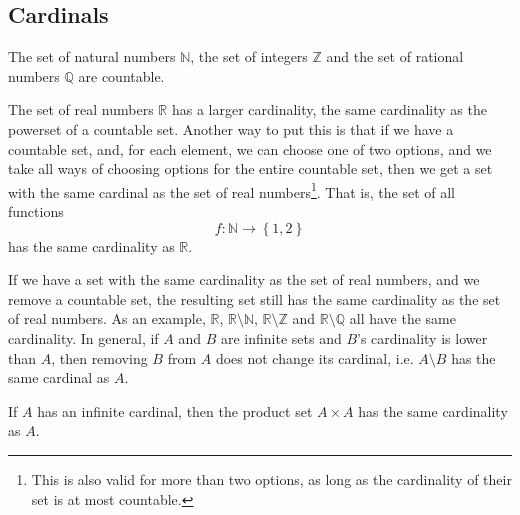 \documentclass[a4paper
]{article}
\def\reale{\mathbb{R}}
\def\intregi{\mathbb{Z}}
\def\naturale{\mathbb{N}}
\def\rationale{\mathbb{Q}}
\newcommand{\multime}[1]{\left\{ #1 \right\}}
\begin{document}
\subsection{Cardinals}
\label{sec:cardinals}

The set of natural numbers $\naturale$, the set of integers $\intregi$ and
the set of rational numbers $\rationale$ are countable.

The set of real numbers $\reale$ has a larger cardinality, the same cardinality
as the powerset of a countable set. Another way to put this is that
if we have a countable set, and, for each element, we can choose one of two
options,
and we take all ways of choosing options for the entire countable set,
then we get a set with the same cardinal as the set of real numbers\footnote{
    This is also valid for more than two options, as long as the cardinality
    of their set is at most countable.
  }.
That is, the set of all functions
$$
f : \naturale \longrightarrow \multime{1, 2}
$$
has the same cardinality as $\reale$.

If we have a set with the same cardinality as the set of real numbers, and
we remove a countable set, the resulting set still has the same cardinality
as the set of real numbers. As an example, $\reale$, $\reale\setminus\naturale$,
$\reale\setminus\intregi$ and $\reale\setminus\rationale$ all have the same
cardinality. In general, if $A$ and $B$ are infinite sets and
$B$'s cardinality is lower than $A$, then removing $B$ from $A$ does not change
its cardinal, i.e. $A\setminus B$ has the same cardinal as $A$.

If $A$ has an infinite cardinal, then the product set $A\times A$ has the same
cardinality as $A$.

\printbibliography
\end{document}
